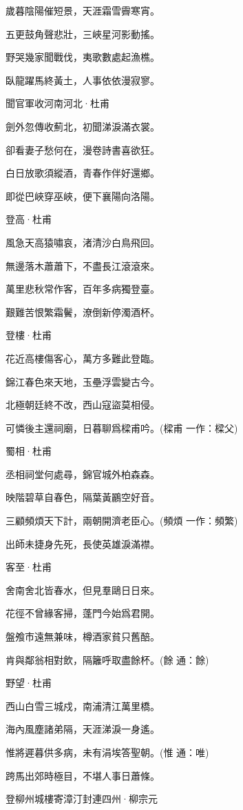 \documentclass[12pt,a4paper]{ctexbook}
\begin{document}
歲暮陰陽催短景，天涯霜雪霽寒宵。\par
五更鼓角聲悲壯，三峽星河影動搖。\par
野哭幾家聞戰伐，夷歌數處起漁樵。\par
臥龍躍馬終黃土，人事依依漫寂寥。\par
聞官軍收河南河北·杜甫\par
劍外忽傳收薊北，初聞涕淚滿衣裳。\par
卻看妻子愁何在，漫卷詩書喜欲狂。\par
白日放歌須縱酒，青春作伴好還鄉。\par
即從巴峽穿巫峽，便下襄陽向洛陽。\par
登高·杜甫\par
風急天高猿嘯哀，渚清沙白鳥飛回。\par
無邊落木蕭蕭下，不盡長江滾滾來。\par
萬里悲秋常作客，百年多病獨登臺。\par
艱難苦恨繁霜鬢，潦倒新停濁酒杯。\par
登樓·杜甫\par
花近高樓傷客心，萬方多難此登臨。\par
錦江春色來天地，玉壘浮雲變古今。\par
北極朝廷終不改，西山寇盜莫相侵。\par
可憐後主還祠廟，日暮聊爲樑甫吟。(樑甫 一作：樑父)\par
蜀相·杜甫\par
丞相祠堂何處尋，錦官城外柏森森。\par
映階碧草自春色，隔葉黃鸝空好音。\par
三顧頻煩天下計，兩朝開濟老臣心。(頻煩 一作：頻繁)\par
出師未捷身先死，長使英雄淚滿襟。\par
客至·杜甫\par
舍南舍北皆春水，但見羣鷗日日來。\par
花徑不曾緣客掃，蓬門今始爲君開。\par
盤飧市遠無兼味，樽酒家貧只舊醅。\par
肯與鄰翁相對飲，隔籬呼取盡餘杯。(餘 通：餘)\par
野望·杜甫\par
西山白雪三城戍，南浦清江萬里橋。\par
海內風塵諸弟隔，天涯涕淚一身遙。\par
惟將遲暮供多病，未有涓埃答聖朝。(惟 通：唯)\par
跨馬出郊時極目，不堪人事日蕭條。\par
登柳州城樓寄漳汀封連四州·柳宗元\par
\end{document}
